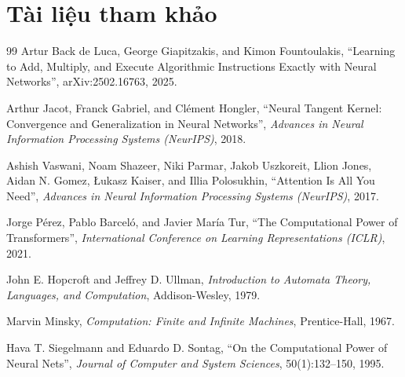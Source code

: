 \chapter*{Tài liệu tham khảo}
\begin{thebibliography}{99}
     Artur Back de Luca, George Giapitzakis, and Kimon Fountoulakis, ``Learning to Add, Multiply, and Execute Algorithmic Instructions Exactly with Neural Networks'', arXiv:2502.16763, 2025.

     Arthur Jacot, Franck Gabriel, and Cl\'ement Hongler, ``Neural Tangent Kernel: Convergence and Generalization in Neural Networks'', \emph{Advances in Neural Information Processing Systems (NeurIPS)}, 2018.

     Ashish Vaswani, Noam Shazeer, Niki Parmar, Jakob Uszkoreit, Llion Jones, Aidan N. Gomez, \L{}ukasz Kaiser, and Illia Polosukhin, ``Attention Is All You Need'', \emph{Advances in Neural Information Processing Systems (NeurIPS)}, 2017.

     Jorge P\'erez, Pablo Barcel\'o, and Javier Mar\'ia Tur, ``The Computational Power of Transformers'', \emph{International Conference on Learning Representations (ICLR)}, 2021.

     John E. Hopcroft and Jeffrey D. Ullman, \emph{Introduction to Automata Theory, Languages, and Computation}, Addison-Wesley, 1979.

     Marvin Minsky, \emph{Computation: Finite and Infinite Machines}, Prentice-Hall, 1967.

     Hava T. Siegelmann and Eduardo D. Sontag, ``On the Computational Power of Neural Nets'', \emph{Journal of Computer and System Sciences}, 50(1):132--150, 1995.

\end{thebibliography}